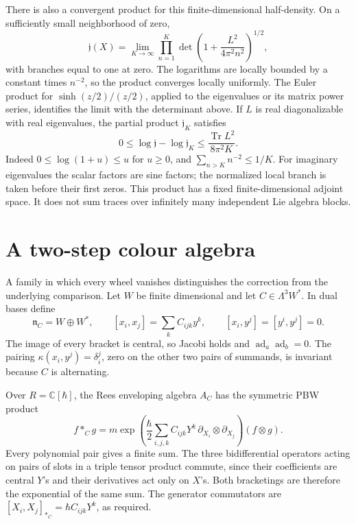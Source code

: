 There is also a convergent product for this
finite-dimensional half-density.
On a sufficiently small neighborhood of zero,
\begin{equation}\label{eq:vol2-half-density-mode-product}
 \mathfrak j(X)=\lim_{K\to\infty}
 \prod_{n=1}^K
       \det\left(1+\frac{L^2}{4\pi^2n^2}\right)^{1/2},
\end{equation}
with branches equal to one at zero.
The logarithms are locally bounded by a constant times
$n^{-2}$, so the product converges locally uniformly.
The Euler product for $\sinh(z/2)/(z/2)$, applied to
the eigenvalues or its matrix power series, identifies
the limit with the determinant above.
If $L$ is real diagonalizable with real eigenvalues,
the partial product $\mathfrak j_K$ satisfies
\[
 0\leq\log\mathfrak j-\log\mathfrak j_K
 \leq\frac{\operatorname{Tr}L^2}{8\pi^2K}.
\]
Indeed $0\leq\log(1+u)\leq u$ for $u\geq0$, and
$\sum_{n>K}n^{-2}\leq1/K$.
For imaginary eigenvalues the scalar factors are
sine factors; the normalized local branch is taken
before their first zeros.
This product has a fixed finite-dimensional adjoint
space. It does not sum traces over infinitely many
independent Lie algebra blocks.

\section{A two-step colour algebra}
\label{sec:vol2-two-step-duflo}

A family in which every wheel vanishes distinguishes
the correction from the underlying comparison.
Let $W$ be finite dimensional and let
$C\in\Lambda^3W^*$.
In dual bases define
\[
 \mathfrak n_C=W\oplus W^*,\qquad
 [x_i,x_j]=\sum_kC_{ijk}y^k,\qquad
 [x_i,y^j]=[y^i,y^j]=0.
\]
The image of every bracket is central, so Jacobi holds
and $\operatorname{ad}_a\operatorname{ad}_b=0$.
The pairing $\kappa(x_i,y^j)=\delta_i^j$, zero on
the other two pairs of summands, is invariant because
$C$ is alternating.

Over $R=\mathbb C[\hbar]$, the Rees enveloping algebra
$A_C$ has the symmetric PBW product
\begin{equation}\label{eq:vol2-colour-pbw-product}
 f*_Cg
 =m\exp\left(
       \frac{\hbar}{2}\sum_{i,j,k}
          C_{ijk}Y^k\,\partial_{X_i}\otimes\partial_{X_j}
       \right)(f\otimes g).
\end{equation}
Every polynomial pair gives a finite sum.
The three bidifferential operators acting on pairs
of slots in a triple tensor product commute, since
their coefficients are central $Y$'s and their
derivatives act only on $X$'s. Both bracketings are
therefore the exponential of the same sum.
The generator commutators are
$[X_i,X_j]_{*_C}=\hbar C_{ijk}Y^k$, as required.

